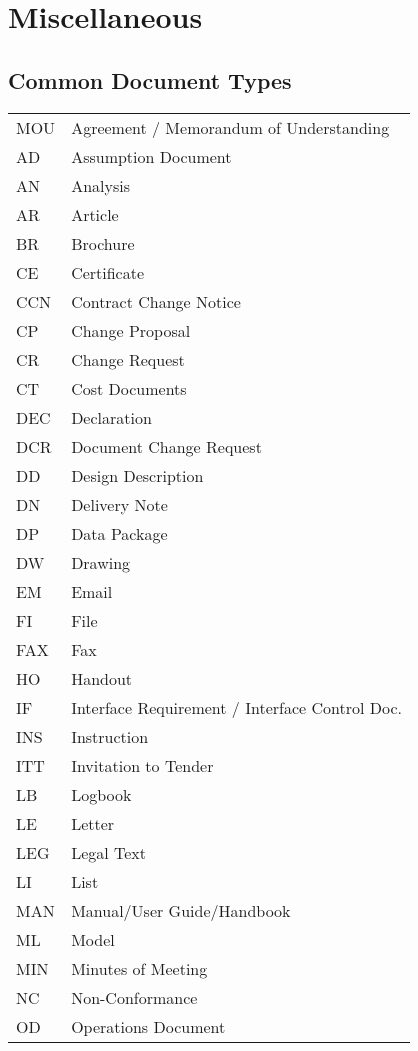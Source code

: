 \chapter{Miscellaneous}


\section{Common Document Types}
\label{sec:Common Document Types}

\begin{longtable}{l l}
MOU & Agreement / Memorandum of Understanding \\
AD & Assumption Document \\
AN & Analysis \\
AR & Article \\
BR & Brochure \\
CE & Certificate \\
CCN & Contract Change Notice \\
CP & Change Proposal \\
CR & Change Request \\
CT & Cost Documents \\
DEC & Declaration \\
DCR & Document Change Request \\
DD & Design Description \\
DN & Delivery Note \\
DP & Data Package \\
DW & Drawing \\
EM & Email \\
FI & File \\
FAX & Fax \\
HO & Handout \\
IF & Interface Requirement / Interface Control Doc. \\
INS & Instruction \\
ITT & Invitation to Tender \\
LB & Logbook \\
LE & Letter \\
LEG & Legal Text \\
LI & List \\
MAN & Manual/User Guide/Handbook \\
ML & Model \\
MIN & Minutes of Meeting \\
NC & Non-Conformance \\
OD & Operations Document \\

\end{longtable}
